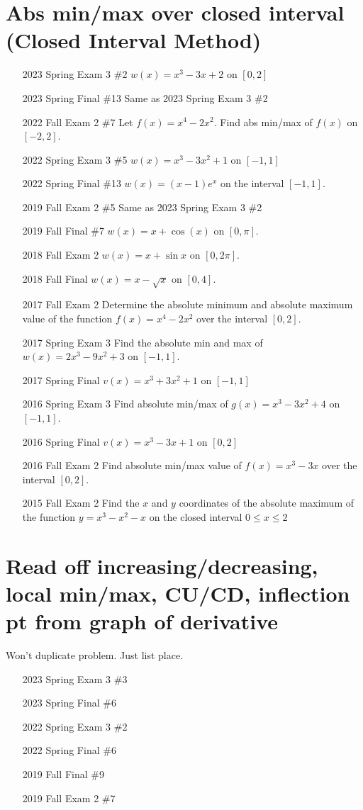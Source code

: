 \documentclass[10pt]{scrartcl}
\theoremstyle{definition}
\begin{document}
\newpage
\section{Abs min/max over closed interval (Closed Interval Method)}
\begin{enumerate}
\item [2023 Spring Exam 3 \#2] $w(x) = x^3-3x+2$ on $[0,2]$
\item [2023 Spring Final \#13] Same as 2023 Spring Exam 3 \#2
\item [2022 Fall Exam 2 \#7] Let $f(x) = x^4-2x^2$. Find abs min/max of $f(x)$ on $[-2,2]$.
\item [2022 Spring Exam 3 \#5] $w(x) = x^3-3x^2+1$ on $[-1,1]$
\item [2022 Spring Final \#13] $w(x) = (x-1)e^x$ on the interval $[-1,1]$.
\item [2019 Fall Exam 2 \#5] Same as 2023 Spring Exam 3 \#2
\item [2019 Fall Final \#7] $w(x) = x + \cos(x)$ on $[0,\pi]$.
\item [2018 Fall Exam 2] $w(x) = x + \sin x$ on $[0, 2\pi]$.
\item [2018 Fall Final] $w(x) = x - \sqrt{x}$ on $[0, 4]$.
\item [2017 Fall Exam 2] Determine the absolute minimum and absolute maximum value of the function $f(x) = x^4 - 2x^2$ over the interval $[0, 2]$.
\item [2017 Spring Exam 3] Find the absolute min and max of $w(x) = 2x^3 - 9x^2 + 3$ on $[-1, 1]$.
\item [2017 Spring Final] $v(x) = x^3 + 3x^2 + 1$ on $[-1, 1]$
\item [2016 Spring Exam 3] Find absolute min/max of $g(x) = x^3 - 3x^2 + 4$ on $[-1, 1]$.
\item [2016 Spring Final] $v(x) = x^3 - 3x + 1$ on $[0, 2]$
\item [2016 Fall Exam 2] Find absolute min/max value of $f(x) = x^3 - 3x$ over the interval $[0, 2]$.
\item [2015 Fall Exam 2] Find the $x$ and $y$ coordinates of the absolute maximum of the function $y = x^3 - x^2 - x$ on the closed interval $0 \le x \le 2$
\end{enumerate}


\section{Read off increasing/decreasing, local min/max, CU/CD, inflection pt from graph of derivative}
Won't duplicate problem. Just list place.
\begin{enumerate}
\item [2023 Spring Exam 3 \#3]
\item [2023 Spring Final \#6]
\item [2022 Spring Exam 3 \#2]
\item [2022 Spring Final \#6]
\item [2019 Fall Final \#9]
\item [2019 Fall Exam 2 \#7]
\end{enumerate}
\end{document}
